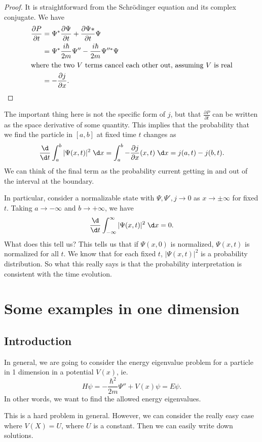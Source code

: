 \documentclass[a4paper]{article}
\begin{document}
\begin{proof}
  It is straightforward from the Schr\"odinger equation and its complex conjugate. We have
  \begin{align*}
    \frac{\partial P}{\partial t} &= \Psi^* \frac{\partial \Psi}{\partial t} + \frac{\partial \Psi*}{\partial t} \Psi\\
    &= \Psi^* \frac{i\hbar }{2m}\Psi'' - \frac{i\hbar}{2m}\Psi''^* \Psi\\
    \intertext{where the two $V$ terms cancel each other out, assuming $V$ is real}
    &= -\frac{\partial j}{\partial x}.
  \end{align*}
\end{proof}
The important thing here is not the specific form of $j$, but that $\frac{\partial P}{\partial t}$ can be written as the space derivative of some quantity. This implies that the probability that we find the particle in $[a, b]$ at fixed time $t$ changes as
\[
  \frac{\d}{\d t}\int_a^b |\Psi(x, t)|^2 \;\d x = \int_a^b -\frac{\partial j}{\partial x}(x, t)\;\d x = j(a, t) - j(b, t).
\]
We can think of the final term as the probability current getting in and out of the interval at the boundary.

In particular, consider a normalizable state with $\Psi, \Psi', j \to 0$ as $x \to \pm\infty$ for fixed $t$. Taking $a \to -\infty$ and $b\to +\infty$, we have
\[
  \frac{\d}{\d t}\int_{-\infty}^\infty |\Psi(x, t)|^2 \;\d x = 0.
\]
What does this tell us? This tells us that if $\Psi(x, 0)$ is normalized, $\Psi(x, t)$ is normalized for all $t$. We know that for each fixed $t$, $|\Psi(x, t)|^2$ is a probability distribution. So what this really says is that the probability interpretation is consistent with the time evolution.

\section{Some examples in one dimension}
\subsection{Introduction}
In general, we are going to consider the energy eigenvalue problem for a particle in 1 dimension in a potential $V(x)$, ie.
\[
  H\psi = -\frac{\hbar^2}{2m}\Psi'' + V(x) \psi = E\psi.
\]
In other words, we want to find the allowed energy eigenvalues.

This is a hard problem in general. However, we can consider the really easy case where $V(X) = U$, where $U$ is a constant. Then we can easily write down solutions.
\end{document}
